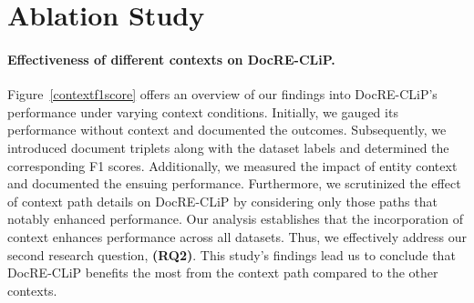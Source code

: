 \documentclass[letterpaper]{article} %
\begin{document}
    


\section{Ablation Study}

\paragraph{\textbf{Effectiveness of different contexts on DocRE-CLiP.}} Figure~\ref{contextf1score} offers an overview of our findings into DocRE-CLiP's performance under varying context conditions. Initially, we gauged its performance without context and documented the outcomes. Subsequently, we introduced document triplets along with the dataset labels and determined the corresponding F1 scores. Additionally, we measured the impact of entity context and documented the ensuing performance. Furthermore, we scrutinized the effect of context path details on DocRE-CLiP by considering only those paths that notably enhanced performance. Our analysis establishes that the incorporation of context enhances performance across all datasets. Thus, we effectively address our second research question, \textbf{(RQ2)}.
This study's findings lead us to conclude that DocRE-CLiP benefits the most from the context path compared to the other contexts.
\end{document}
